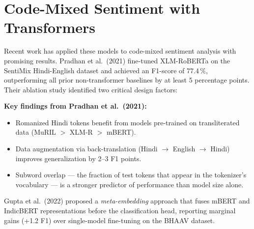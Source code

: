 \section{Code-Mixed Sentiment with Transformers}

Recent work has applied these models to code-mixed sentiment analysis with promising results. Pradhan et al.\ (2021) \cite{pradhan2021} fine-tuned XLM-RoBERTa on the SentiMix Hindi-English dataset and achieved an F1-score of 77.4\,\%, outperforming all prior non-transformer baselines by at least 5 percentage points. Their ablation study identified two critical design factors:

\begin{rvsummary}
\textbf{Key findings from Pradhan et al.\ (2021):}
\begin{itemize}
  \item Romanized Hindi tokens benefit from models pre-trained on transliterated data (MuRIL $>$ XLM-R $>$ mBERT).
  \item Data augmentation via back-translation (Hindi $\rightarrow$ English $\rightarrow$ Hindi) improves generalization by 2--3 F1 points.
  \item Subword overlap — the fraction of test tokens that appear in the tokenizer's vocabulary — is a stronger predictor of performance than model size alone.
\end{itemize}
\end{rvsummary}

Gupta et al.\ (2022) \cite{gupta2022} proposed a \emph{meta-embedding} approach that fuses mBERT and IndicBERT representations before the classification head, reporting marginal gains (+1.2 F1) over single-model fine-tuning on the BHAAV dataset.
